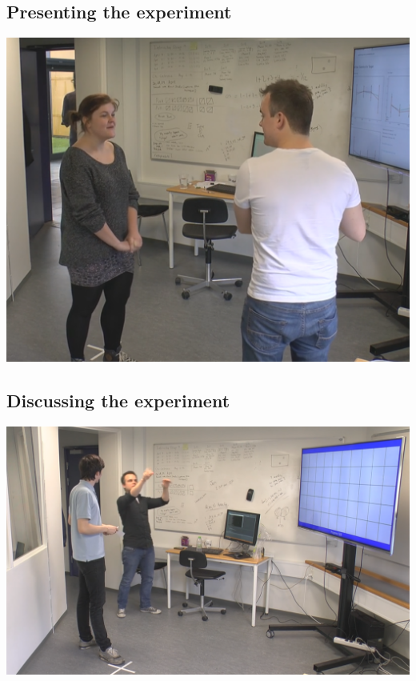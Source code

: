 \subsection*{Presenting the experiment}
\includegraphics[width=\textwidth]{docs/appendix/files/introduction.png}

\subsection*{Discussing the experiment}
\includegraphics[width=\textwidth]{docs/appendix/files/discussion.png}

